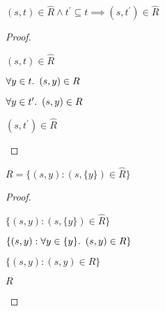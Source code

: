 \begin{prop}\label{prop:rel-hat-subset}
  $(s,t)\in\widehat{R}\land t^\prime\subseteq t\implies (s,t^\prime)\in\widehat{R}$
  \begin{proof}~\\
    \begin{itemize}
      \step
        $(s,t)\in\widehat{R}$
        \marginnote{\Hyp}

      \step[\iffs]
        $\forall y\in t\ldotp~(s,y)\in R$

      \step[\imps]
        $\forall y\in t^\prime\ldotp~(s,y)\in R$

      \step[\iffs]
        $(s, t^\prime)\in\widehat{R}$
        \qedhere
    \end{itemize}
  \end{proof}
\end{prop}

\begin{prop}\label{prop:rel-rel-hat}
  $R = \{(s,y) : (s,\{y\})\in\widehat{R}\}$
  \begin{proof}~\\
    \begin{itemize}
      \step $\{(s,y):(s,\{y\})\in\widehat{R}\}$

      \step[=] $\{(s,y):\forall y\in\{y\}\ldotp~(s,y)\in R\}$

      \step[=] $\{(s,y):(s,y)\in R\}$

      \step[=] $R$\qedhere
    \end{itemize}
  \end{proof}
\end{prop}

